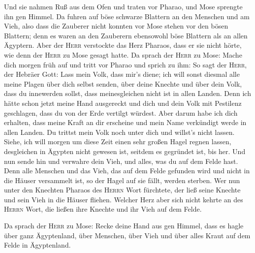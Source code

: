  Und sie nahmen Ruß aus dem Ofen und traten vor Pharao,
und Mose sprengte ihn gen Himmel. Da fuhren auf böse schwarze Blattern
an den Menschen und am Vieh,  also dass die Zauberer
nicht konnten vor Mose stehen vor den bösen Blattern; denn es waren an
den Zauberern ebensowohl böse Blattern als an allen Ägyptern.
 Aber der \textsc{Herr} verstockte das Herz Pharaos, dass
er sie nicht hörte, wie denn der \textsc{Herr} zu Mose gesagt hatte.
 Da sprach der \textsc{Herr} zu Mose: Mache dich morgen
früh auf und tritt vor Pharao und sprich zu ihm: So sagt der
\textsc{Herr}, der Hebräer Gott: Lass mein Volk, dass mir's diene;
 ich will sonst diesmal alle meine Plagen über dich
selbst senden, über deine Knechte und über dein Volk, dass du innewerden
sollst, dass meinesgleichen nicht ist in allen Landen. 
Denn ich hätte schon jetzt meine Hand ausgereckt und dich und dein Volk
mit Pestilenz geschlagen, dass du von der Erde vertilgt würdest.
 Aber darum habe ich dich erhalten, dass meine Kraft an
dir erscheine und mein Name verkündigt werde in allen Landen.
 Du trittst mein Volk noch unter dich und willst's nicht
lassen.  Siehe, ich will morgen um diese Zeit einen sehr
großen Hagel regnen lassen, desgleichen in Ägypten nicht gewesen ist,
seitdem es gegründet ist, bis her.  Und nun sende hin und
verwahre dein Vieh, und alles, was du auf dem Felde hast. Denn alle
Menschen und das Vieh, das auf dem Felde gefunden wird und nicht in die
Häuser versammelt ist, so der Hagel auf sie fällt, werden sterben.
 Wer nun unter den Knechten Pharaos des \textsc{Herrn}
Wort fürchtete, der ließ seine Knechte und sein Vieh in die Häuser
fliehen.  Welcher Herz aber sich nicht kehrte an des
\textsc{Herrn} Wort, die ließen ihre Knechte und ihr Vieh auf dem Felde.

 Da sprach der \textsc{Herr} zu Mose: Recke deine Hand
aus gen Himmel, dass es hagle über ganz Ägyptenland, über Menschen, über
Vieh und über alles Kraut auf dem Felde in Ägyptenland.

